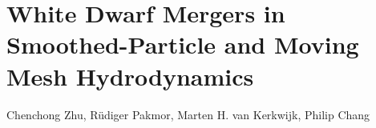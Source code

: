 \chapter{White Dwarf Mergers in Smoothed-Particle and Moving Mesh Hydrodynamics}

\begin{center}
\begin{minipage}[c]{4.75in}
Chenchong Zhu, R\"{u}diger Pakmor, Marten H. van Kerkwijk, Philip Chang\\
\vspace{2em}
\end{minipage}
\end{center}
